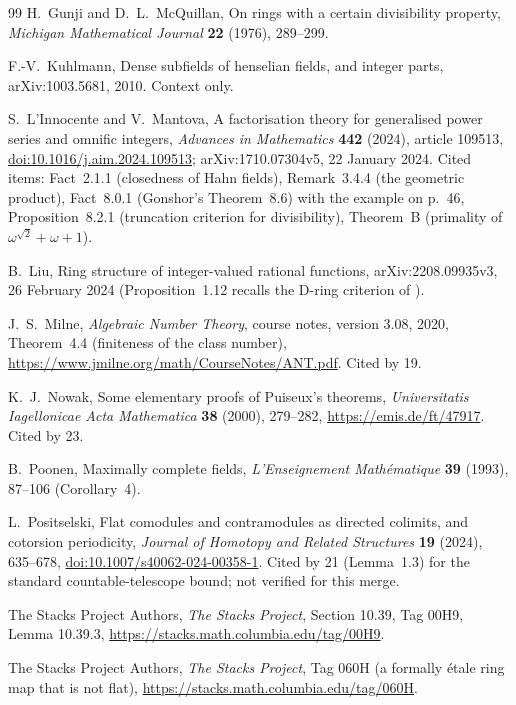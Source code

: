 \documentclass[11pt,letterpaper]{article}
\numberwithin{equation}{section}
\theoremstyle{definition}
\theoremstyle{remark}
\theoremstyle{plain}
\begin{document}
\begin{thebibliography}{99}
H.~Gunji and D.~L.~McQuillan, On rings with a certain divisibility property, \emph{Michigan
Mathematical Journal} \textbf{22} (1976), 289--299.

F.-V.~Kuhlmann, Dense subfields of henselian fields, and integer parts, arXiv:1003.5681, 2010.
Context only.

S.~L'Innocente and V.~Mantova, A factorisation theory for generalised power series and omnific
integers, \emph{Advances in Mathematics} \textbf{442} (2024), article 109513,
\href{https://doi.org/10.1016/j.aim.2024.109513}{doi:10.1016/j.aim.2024.109513}; arXiv:1710.07304v5,
22 January 2024. Cited items: Fact~2.1.1 (closedness of Hahn fields), Remark~3.4.4 (the geometric
product), Fact~8.0.1 (Gonshor's Theorem~8.6) with the example on p.~46, Proposition~8.2.1
(truncation criterion for divisibility), Theorem~B (primality of $\omega^{\sqrt2}+\omega+1$).

B.~Liu, Ring structure of integer-valued rational functions, arXiv:2208.09935v3, 26 February 2024
(Proposition~1.12 recalls the D-ring criterion of \cite{GunjiMcQuillan}).

J.~S.~Milne, \emph{Algebraic Number Theory}, course notes, version 3.08, 2020, Theorem~4.4 (finiteness of the class number),
\url{https://www.jmilne.org/math/CourseNotes/ANT.pdf}. Cited by 19.

K.~J.~Nowak, Some elementary proofs of Puiseux's theorems, \emph{Universitatis Iagellonicae Acta Mathematica} \textbf{38} (2000), 279--282,
\url{https://emis.de/ft/47917}. Cited by 23.

B.~Poonen, Maximally complete fields, \emph{L'Enseignement Math\'ematique} \textbf{39} (1993),
87--106 (Corollary~4).

L.~Positselski, Flat comodules and contramodules as directed colimits, and cotorsion periodicity, \emph{Journal of Homotopy and Related
Structures} \textbf{19} (2024), 635--678, \href{https://doi.org/10.1007/s40062-024-00358-1}{doi:10.1007/s40062-024-00358-1}. Cited by 21
(Lemma~1.3) for the standard countable-telescope bound; not verified for this merge.

The Stacks Project Authors, \emph{The Stacks Project}, Section 10.39, Tag 00H9, Lemma 10.39.3,
\url{https://stacks.math.columbia.edu/tag/00H9}.

The Stacks Project Authors, \emph{The Stacks Project}, Tag 060H (a formally \'etale ring map that is not
flat), \url{https://stacks.math.columbia.edu/tag/060H}.


\end{thebibliography}
\end{document}
